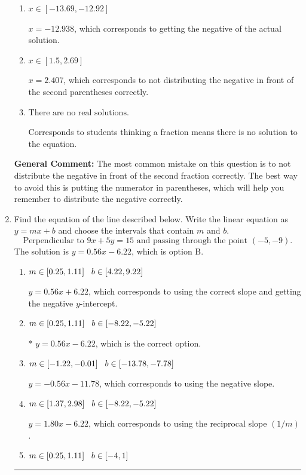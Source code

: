 \documentclass{extbook}[14pt]
\newcommand{\litem}[1]{\item #1

\rule{\textwidth}{0.4pt}}
\begin{document}
\begin{enumerate}
{\begin{enumerate}[label=\Alph*.]
* $x = -1.942$, which is the correct option.
\item \( x \in [-13.69, -12.92] \)

$x = -12.938$, which corresponds to getting the negative of the actual solution.
\item \( x \in [1.5, 2.69] \)

$x = 2.407$, which corresponds to not distributing the negative in front of the second parentheses correctly.
\item \( \text{There are no real solutions.} \)

Corresponds to students thinking a fraction means there is no solution to the equation.
\end{enumerate}

\textbf{General Comment:} The most common mistake on this question is to not distribute the negative in front of the second fraction correctly. The best way to avoid this is putting the numerator in parentheses, which will help you remember to distribute the negative correctly.
}
\litem{
Find the equation of the line described below. Write the linear equation as $ y=mx+b $ and choose the intervals that contain $m$ and $b$.
\[ \text{Perpendicular to } 9 x + 5 y = 15 \text{ and passing through the point } (-5, -9). \]The solution is \( y = 0.56x - 6.22 \), which is option B.\begin{enumerate}[label=\Alph*.]
\item \( m \in [0.25, 1.11] \hspace*{3mm} b \in [4.22, 9.22] \)

 $y = 0.56x + 6.22$, which corresponds to using the correct slope and getting the negative $y$-intercept.
\item \( m \in [0.25, 1.11] \hspace*{3mm} b \in [-8.22, -5.22] \)

* $y = 0.56x - 6.22$, which is the correct option.
\item \( m \in [-1.22, -0.01] \hspace*{3mm} b \in [-13.78, -7.78] \)

 $y = -0.56x - 11.78$, which corresponds to using the negative slope.
\item \( m \in [1.37, 2.98] \hspace*{3mm} b \in [-8.22, -5.22] \)

 $y = 1.80x - 6.22$, which corresponds to using the reciprocal slope $(1/m)$.
\item \( m \in [0.25, 1.11] \hspace*{3mm} b \in [-4, 1] \)


\end{enumerate}}
\end{enumerate}
\end{document}
